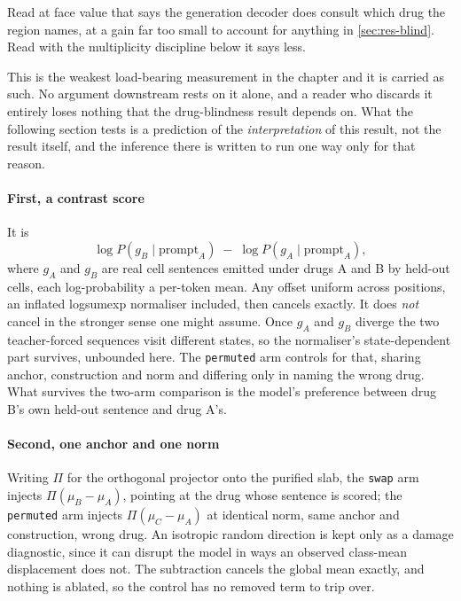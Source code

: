 Read at face value that says the generation decoder does consult which drug the
region names, at a gain far too small to account for anything in
\cref{sec:res-blind}. Read with the multiplicity discipline below it says less.

\begin{scopelimit}
This is the weakest load-bearing measurement in the chapter and it is carried as
such. No argument downstream rests on it alone, and a reader who discards it
entirely loses nothing that the drug-blindness result depends on. What the
following section tests is a prediction of the \emph{interpretation} of this
result, not the result itself, and the inference there is written to run one way
only for that reason.
\end{scopelimit}

\paragraph{First, a contrast score} It is
\begin{equation}
 \log P\!\left(g_B \mid \textrm{prompt}_A\right) \;-\;
 \log P\!\left(g_A \mid \textrm{prompt}_A\right),
\end{equation}
where $g_A$ and $g_B$ are real cell sentences emitted under drugs A and B by
held-out cells, each log-probability a per-token mean. Any offset uniform across
positions, an inflated logsumexp normaliser included, then cancels exactly. It
does \emph{not} cancel in the stronger sense one might assume. Once $g_A$ and
$g_B$ diverge the two teacher-forced sequences visit different states, so the
normaliser's state-dependent part survives, unbounded here. The \texttt{permuted}
arm controls for that, sharing anchor, construction and norm and differing only
in naming the wrong drug. What survives the two-arm comparison is the model's
preference between drug B's own held-out sentence and drug A's.

\paragraph{Second, one anchor and one norm} Writing $\Pi$ for the orthogonal
projector onto the purified slab, the \texttt{swap} arm injects
$\Pi(\mu_B - \mu_A)$, pointing at the drug whose sentence is scored; the
\texttt{permuted} arm injects $\Pi(\mu_C - \mu_A)$ at identical norm, same anchor
and construction, wrong drug. An isotropic random direction is kept only as a
damage diagnostic, since it can disrupt the model in ways an observed class-mean
displacement does not. The subtraction cancels the global mean exactly, and
nothing is ablated, so the control has no removed term to trip over.

